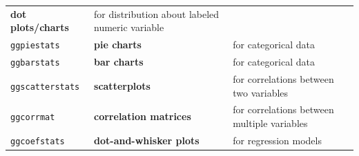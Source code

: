 \documentclass[]{article}
\begin{document}
\begin{longtable}[]{@{}lll@{}}
\begin{minipage}[t]{0.19\columnwidth}
\textbf{dot plots/charts}\strut
\end{minipage} & \begin{minipage}[t]{0.54\columnwidth}\raggedright
for distribution about labeled numeric variable\strut
\end{minipage}\tabularnewline
\begin{minipage}[t]{0.19\columnwidth}\raggedright
\texttt{ggpiestats}\strut
\end{minipage} & \begin{minipage}[t]{0.19\columnwidth}\raggedright
\textbf{pie charts}\strut
\end{minipage} & \begin{minipage}[t]{0.54\columnwidth}\raggedright
for categorical data\strut
\end{minipage}\tabularnewline
\begin{minipage}[t]{0.19\columnwidth}\raggedright
\texttt{ggbarstats}\strut
\end{minipage} & \begin{minipage}[t]{0.19\columnwidth}\raggedright
\textbf{bar charts}\strut
\end{minipage} & \begin{minipage}[t]{0.54\columnwidth}\raggedright
for categorical data\strut
\end{minipage}\tabularnewline
\begin{minipage}[t]{0.19\columnwidth}\raggedright
\texttt{ggscatterstats}\strut
\end{minipage} & \begin{minipage}[t]{0.19\columnwidth}\raggedright
\textbf{scatterplots}\strut
\end{minipage} & \begin{minipage}[t]{0.54\columnwidth}\raggedright
for correlations between two variables\strut
\end{minipage}\tabularnewline
\begin{minipage}[t]{0.19\columnwidth}\raggedright
\texttt{ggcorrmat}\strut
\end{minipage} & \begin{minipage}[t]{0.19\columnwidth}\raggedright
\textbf{correlation matrices}\strut
\end{minipage} & \begin{minipage}[t]{0.54\columnwidth}\raggedright
for correlations between multiple variables\strut
\end{minipage}\tabularnewline
\begin{minipage}[t]{0.19\columnwidth}\raggedright
\texttt{ggcoefstats}\strut
\end{minipage} & \begin{minipage}[t]{0.19\columnwidth}\raggedright
\textbf{dot-and-whisker plots}\strut
\end{minipage} & \begin{minipage}[t]{0.54\columnwidth}\raggedright
for regression models\strut
\end{minipage}\tabularnewline
\bottomrule
\end{longtable}
\end{document}
